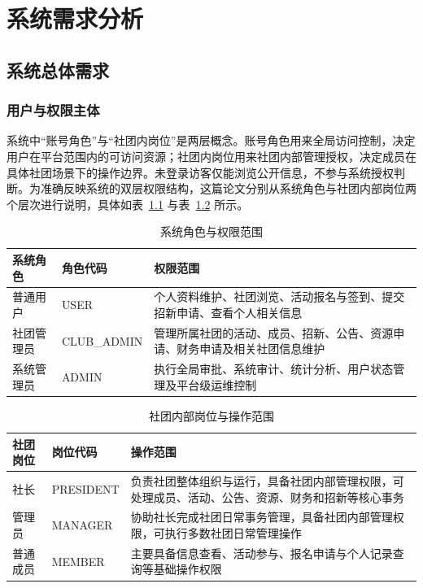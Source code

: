 ﻿%
\chapter{系统需求分析}

\section{系统总体需求}

\subsection{用户与权限主体}

系统中“账号角色”与“社团内岗位”是两层概念。账号角色用来全局访问控制，决定用户在平台范围内的可访问资源；社团内岗位用来社团内部管理授权，决定成员在具体社团场景下的操作边界。未登录访客仅能浏览公开信息，不参与系统授权判断。为准确反映系统的双层权限结构，这篇论文分别从系统角色与社团内部岗位两个层次进行说明，具体如表~\ref{tab:user-roles} 与表~\ref{tab:club-posts} 所示。

\begin{table}[H]
\centering
\caption{系统角色与权限范围}
\label{tab:user-roles}
\begin{tabular}{p{2.8cm}p{3.2cm}p{7.6cm}}
\toprule
系统角色 & 角色代码 & 权限范围 \\
\midrule
普通用户 & USER & 个人资料维护、社团浏览、活动报名与签到、提交招新申请、查看个人相关信息 \\
社团管理员 & CLUB\_ADMIN & 管理所属社团的活动、成员、招新、公告、资源申请、财务申请及相关社团信息维护 \\
系统管理员 & ADMIN & 执行全局审批、系统审计、统计分析、用户状态管理及平台级运维控制 \\
\bottomrule
\end{tabular}
\end{table}

\begin{table}[H]
\centering
\caption{社团内部岗位与操作范围}
\label{tab:club-posts}
\begin{tabular}{p{2.8cm}p{3.2cm}p{7.6cm}}
\toprule
社团岗位 & 岗位代码 & 操作范围 \\
\midrule
社长 & PRESIDENT & 负责社团整体组织与运行，具备社团内部管理权限，可处理成员、活动、公告、资源、财务和招新等核心事务 \\
管理员 & MANAGER & 协助社长完成社团日常事务管理，具备社团内部管理权限，可执行多数社团日常管理操作 \\
普通成员 & MEMBER & 主要具备信息查看、活动参与、报名申请与个人记录查询等基础操作权限 \\
\bottomrule
\end{tabular}
\end{table}

